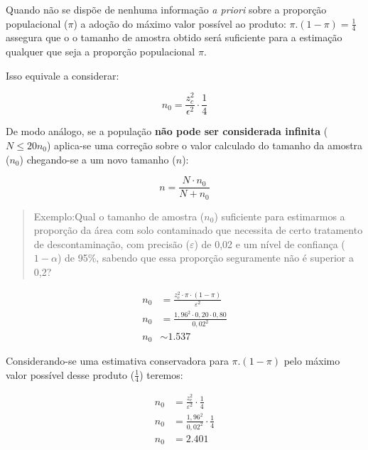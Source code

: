 \documentclass[
]{book}
\begin{document}
Quando não se dispõe de nenhuma informação \emph{a priori} sobre a proporção populacional (\(\pi\)) a adoção do máximo valor possível ao produto: \(\pi . (1- \pi )=\frac{1}{4}\) assegura que o o tamanho de amostra obtido será suficiente para a estimação qualquer que seja a proporção populacional \(\pi\).

\hfill\break

Isso equivale a considerar:

\hfill\break

\[
n_{0} = \frac{z_{c}^{2}}{\epsilon^{2}} \cdot \frac{1}{4}
\]

\hfill\break

De modo análogo, se a população \textbf{não pode ser considerada infinita} (\(N \le 20n_{0}\)) aplica-se uma correção sobre o valor calculado do tamanho da amostra (\(n_{0}\)) chegando-se a um novo tamanho (\(n\)):

\hfill\break

\[
n=\frac{N \cdot n_{0}}{N + n_{0}}
\]

\hfill\break

\begin{quote}
Exemplo:Qual o tamanho de amostra (\(n_{0}\)) suficiente para estimarmos a proporção da área com solo contaminado que necessita de certo tratamento de descontaminação, com precisão (\(\varepsilon\)) de 0,02 e um nível de confiança (\(1-\alpha\)) de 95\%, sabendo que essa proporção seguramente não é superior a 0,2?
\end{quote}

\hfill\break

\begin{align*}
n_{0} & = \frac{z_{c}^{2} \cdot \pi \cdot (1-\pi) }{\varepsilon^{2}} \\
n_{0} & = \frac{1,96^{2} \cdot 0,20 \cdot 0,80 }{0,02^{2}}\\ 
n_{0} & \sim 1.537
\end{align*}

\hfill\break

Considerando-se uma estimativa conservadora para \(\pi.(1-\pi)\) pelo máximo valor possível desse produto (\(\frac{1}{4}\)) teremos:

\hfill\break

\begin{align*}
n_{0} & =  \frac{z_{c}^{2}}{\varepsilon^{2}} \cdot \frac{1}{4} \\
n_{0} & =  \frac{1,96^{2}}{0,02^{2}} \cdot \frac{1}{4} \\
n_{0} & =  2.401
\end{align*}
\end{document}

